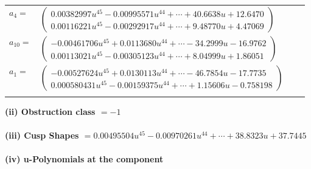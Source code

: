 \documentclass[1p]{elsarticle_modified}
\theoremstyle{definition}
\begin{document}
\begin{tabular}{m{7pt} m{180pt} m{7pt} m{180pt} }
\flushright $a_{4}=$&$\begin{pmatrix}0.00382997 u^{45}-0.00995571 u^{44}+\cdots+40.6638 u+12.6470\\0.00116221 u^{45}-0.00292917 u^{44}+\cdots+9.48770 u+4.47069\end{pmatrix}$ \\
\flushright $a_{10}=$&$\begin{pmatrix}-0.00461706 u^{45}+0.0113680 u^{44}+\cdots-34.2999 u-16.9762\\0.00113021 u^{45}-0.00305123 u^{44}+\cdots+8.04999 u+1.86051\end{pmatrix}$ \\
\flushright $a_{1}=$&$\begin{pmatrix}-0.00527624 u^{45}+0.0130113 u^{44}+\cdots-46.7854 u-17.7735\\0.000580431 u^{45}-0.00159375 u^{44}+\cdots+1.15606 u-0.758198\end{pmatrix}$\\&\end{tabular}
\flushleft \textbf{(ii) Obstruction class $= -1$}\\~\\
\flushleft \textbf{(iii) Cusp Shapes $= 0.00495504 u^{45}-0.00970261 u^{44}+\cdots+38.8323 u+37.7445$}\\~\\
\newpage\renewcommand{\arraystretch}{1}
\flushleft \textbf{(iv) u-Polynomials at the component}\newline \\
\end{document}
